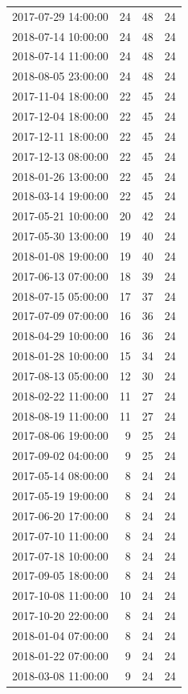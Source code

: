 \begin{tabular}{lrrr}
2017-07-29 14:00:00 & 24 & 48 & 24 \\
2018-07-14 10:00:00 & 24 & 48 & 24 \\
2018-07-14 11:00:00 & 24 & 48 & 24 \\
2018-08-05 23:00:00 & 24 & 48 & 24 \\
2017-11-04 18:00:00 & 22 & 45 & 24 \\
2017-12-04 18:00:00 & 22 & 45 & 24 \\
2017-12-11 18:00:00 & 22 & 45 & 24 \\
2017-12-13 08:00:00 & 22 & 45 & 24 \\
2018-01-26 13:00:00 & 22 & 45 & 24 \\
2018-03-14 19:00:00 & 22 & 45 & 24 \\
2017-05-21 10:00:00 & 20 & 42 & 24 \\
2017-05-30 13:00:00 & 19 & 40 & 24 \\
2018-01-08 19:00:00 & 19 & 40 & 24 \\
2017-06-13 07:00:00 & 18 & 39 & 24 \\
2018-07-15 05:00:00 & 17 & 37 & 24 \\
2017-07-09 07:00:00 & 16 & 36 & 24 \\
2018-04-29 10:00:00 & 16 & 36 & 24 \\
2018-01-28 10:00:00 & 15 & 34 & 24 \\
2017-08-13 05:00:00 & 12 & 30 & 24 \\
2018-02-22 11:00:00 & 11 & 27 & 24 \\
2018-08-19 11:00:00 & 11 & 27 & 24 \\
2017-08-06 19:00:00 & 9 & 25 & 24 \\
2017-09-02 04:00:00 & 9 & 25 & 24 \\
2017-05-14 08:00:00 & 8 & 24 & 24 \\
2017-05-19 19:00:00 & 8 & 24 & 24 \\
2017-06-20 17:00:00 & 8 & 24 & 24 \\
2017-07-10 11:00:00 & 8 & 24 & 24 \\
2017-07-18 10:00:00 & 8 & 24 & 24 \\
2017-09-05 18:00:00 & 8 & 24 & 24 \\
2017-10-08 11:00:00 & 10 & 24 & 24 \\
2017-10-20 22:00:00 & 8 & 24 & 24 \\
2018-01-04 07:00:00 & 8 & 24 & 24 \\
2018-01-22 07:00:00 & 9 & 24 & 24 \\
2018-03-08 11:00:00 & 9 & 24 & 24 \\

\end{tabular}
